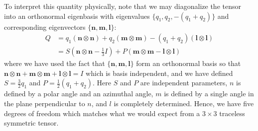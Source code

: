 \documentclass[reqno]{article}
\begin{document}
  To interpret this quantity physically, note that we may diagonalize the tensor into an
  orthonormal eigenbasis with eigenvalues $\{q_1, q_2, -(q_1 + q_2)\}$ and corresponding
  eigenvectors $\{\mathbf{n}, \mathbf{m}, \mathbf{l}\}$:
  \begin{equation}
    \begin{split}
    Q
    &=
    q_1 (\mathbf{n} \otimes \mathbf{n})
    + q_2 (\mathbf{m} \otimes \mathbf{m})
    - (q_1 + q_2) (\mathbf{l} \otimes \mathbf{l}) \\
    &= S (\mathbf{n} \otimes \mathbf{n} - \tfrac13 I)
    + P (\mathbf{m} \otimes \mathbf{m} - \mathbf{l} \otimes \mathbf{l})
    \end{split}
  \end{equation}
  where we have used the fact that $\{\mathbf{n}, \mathbf{m}, \mathbf{l}\}$ form
  an orthonormal basis so that $\mathbf{n} \otimes \mathbf{n} + \mathbf{m}
  \otimes \mathbf{m} + \mathbf{l} \otimes \mathbf{l} = I$ which is basis
  independent, and we have defined $S = \tfrac32 q_1$ and $P = \tfrac12 (q_1 + q_2)$.
  Here $S$ and $P$ are independent parameters, $n$ is defined by a
  polar angle and an azimuthal angle, $m$ is defined by a single angle
  in the plane perpendicular to $n$, and $l$ is completely
  determined.
  Hence, we have five degrees of freedom which matches what we would expect
  from a $3\times 3$ traceless symmetric tensor.
  
\end{document}

